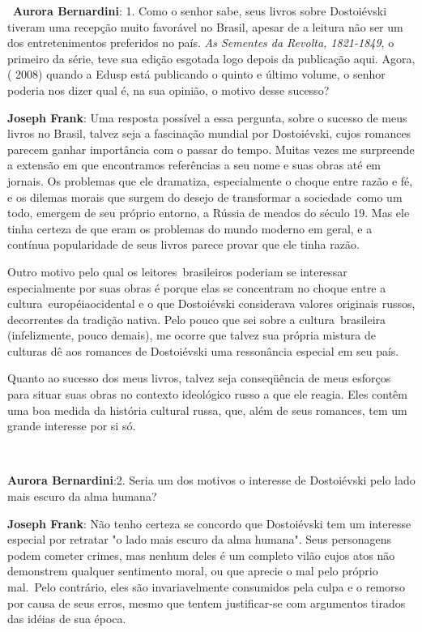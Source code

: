 ~\textbf{Aurora Bernardini}: 1. Como o senhor sabe, seus livros sobre
Dostoiévski tiveram uma recepção muito favorável no Brasil, apesar de a
leitura não ser um dos entretenimentos preferidos no país. \emph{As
Sementes da Revolta, 1821-1849}, o primeiro da série, teve sua edição
esgotada logo depois da publicação aqui. Agora, ( 2008) quando a Edusp
está publicando o quinto e último volume, o senhor poderia nos dizer
qual é, na sua opinião, o motivo desse sucesso?

\textbf{Joseph Frank}: Uma resposta possível a essa pergunta, sobre o
sucesso de meus livros no Brasil, talvez seja a fascinação mundial por
Dostoiévski, cujos romances parecem ganhar importância com o passar do
tempo. Muitas vezes me surpreende a extensão em que encontramos
referências a seu nome e suas obras até em jornais. Os problemas que ele
dramatiza, especialmente o choque entre razão e fé, e os dilemas morais
que surgem do desejo de transformar a sociedade~como um todo, emergem de
seu próprio entorno, a Rússia de meados do século 19. Mas ele tinha
certeza de que eram os problemas do mundo moderno em geral, e a contínua
popularidade de seus livros parece provar que ele tinha razão.

Outro motivo pelo qual os leitores~brasileiros poderiam se interessar
especialmente por suas obras é porque elas se concentram no choque entre
a cultura~européiaocidental e o que Dostoiévski considerava valores
originais russos, decorrentes da tradição nativa. Pelo pouco que sei
sobre a cultura~brasileira (infelizmente, pouco demais), me ocorre que
talvez sua própria mistura de culturas dê aos romances de Dostoiévski
uma ressonância especial em seu país.

Quanto ao sucesso dos meus livros, talvez seja conseqüência de meus
esforços para situar suas obras no contexto ideológico russo a que ele
reagia. Eles contêm uma boa medida da história cultural russa, que, além
de seus romances, tem um grande interesse por si só.

~

\textbf{Aurora Bernardini}:2. Seria um dos motivos o interesse de
Dostoiévski pelo lado mais escuro da alma humana?

\textbf{Joseph Frank}: Não tenho certeza se concordo que Dostoiévski tem
um interesse especial por retratar "o lado mais escuro da alma humana".
Seus personagens podem cometer crimes, mas nenhum deles é um completo
vilão cujos atos não demonstrem qualquer sentimento moral, ou que
aprecie o mal pelo próprio mal.~Pelo contrário, eles são invariavelmente
consumidos pela culpa e o remorso por causa de seus erros, mesmo que
tentem justificar-se com argumentos tirados das idéias de sua época.


